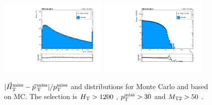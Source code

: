 \begin{figure}[htbp]
  \begin{center}
    \includegraphics[width=0.46\textwidth]{figs/qcd/rs_mc/highht_diffMetMhtOverMet.pdf}
    \includegraphics[width=0.46\textwidth]{figs/qcd/rs_mc/highht_deltaPhiMin.pdf}
    \caption{$|\vec{H}_{\mathrm{T}}^{\mathrm{miss}}-\vec{p}_{\> \mathrm{T}}^{\> \mathrm{miss}}|/p_{\mathrm{T}}^{\mathrm{miss}}$ and \dphimet distributions for Monte Carlo and \rs based on MC. The selection is $H_{\mathrm{T}} > 1200$ \GeV, $p_{\mathrm{T}}^{\mathrm{miss}} > 30$ \GeV and $M_{\mathrm{T2}} > 50$ \GeV.
            }
    \label{Fig:rs_mc_deltaphi_highht}
  \end{center}
\end{figure}

